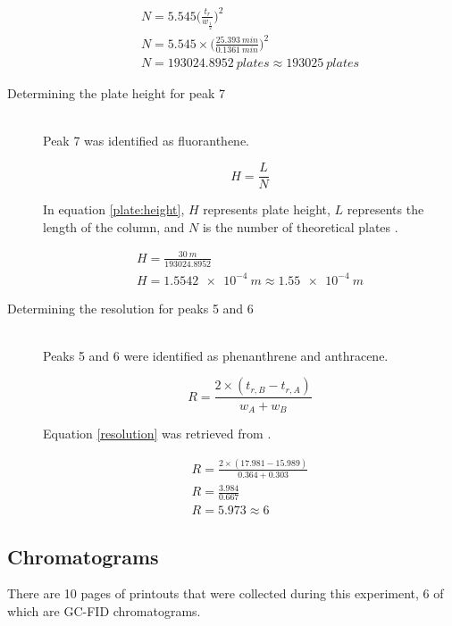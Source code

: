 \documentclass[a4paper, 12pt]{article}
\begin{document}
\begin{description}
	\begin{gather*}
		N = 5.545\Bigg(\frac{t_r}{w_\frac{1}{2}}\Bigg)^2 \\
		N = \num{5.545} \times \Bigg(\frac{\SI{25.393}{min}}{\SI{0.1361}{min}}\Bigg)^2 \\
		N = \SI{193024.8952}{plates} \approx \SI{193025}{plates}
	\end{gather*}

\item[Determining the plate height for peak 7] \hfill \\
	Peak 7 was identified as fluoranthene.

	\begin{equation} \label{plate:height}
		H = \frac{L}{N}
	\end{equation}

	In equation \ref{plate:height}, $H$ represents plate height, $L$ represents the length of the column, and $N$ is the number of theoretical plates \cite{harris_quantitative_2010}.

	\begin{gather*}
		H = \frac{\SI{30}{m}}{193024.8952} \\
		H = \SI{1.5542e-4}{m} \approx \SI{1.55e-4}{m}
	\end{gather*}

\item[Determining the resolution for peaks 5 and 6] \hfill \\
	Peaks 5 and 6 were identified as phenanthrene and anthracene.

	\begin{equation} \label{resolution}
		R = \frac{2 \times (t_{r,B} - t_{r,A})}{w_A + w_B}
	\end{equation}

	Equation \ref{resolution} was retrieved from \cite{vitha_chromatography:_2017}.

	\begin{gather*}
		R = \frac{2 \times (17.981 - 15.989)}{0.364 + 0.303} \\
		R = \frac{3.984}{0.667} \\
		R = 5.973 \approx 6
	\end{gather*}

\end{description}

\subsection{Chromatograms}
There are 10 pages of printouts that were collected during this experiment, 6 of which are GC-FID chromatograms.


\end{document}
